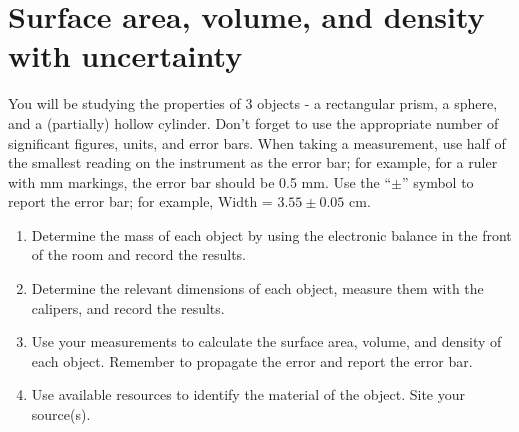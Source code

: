 \section{Surface area, volume, and density with uncertainty}

You will be studying the properties of 3 objects - a rectangular prism, a sphere, and a (partially) hollow cylinder.
Don’t forget to use the appropriate number of significant figures, units, and error bars.
When taking a measurement, use half of the smallest reading on the instrument as the error bar;
for example, for a ruler with mm markings, the error bar should be 0.5 mm.
Use the ``$\pm$'' symbol to report the error bar; for example, Width = $3.55 \pm 0.05$ cm.
\begin{enumerate}
\item Determine the mass of each object by using the electronic balance in the front of the room and record the results.
\item Determine the relevant dimensions of each object, measure them with the calipers, and record the results. 
\item Use your measurements to calculate the surface area, volume, and density of each object. Remember to propagate the error and report the error bar.
\item Use available resources to identify the material of the object. Site your source(s).
\end{enumerate}

\pagebreak \clearpage
